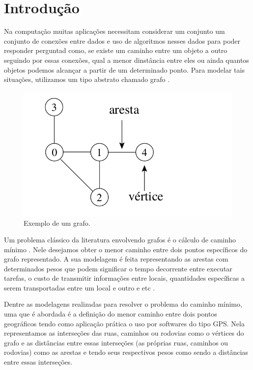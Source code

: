\chapter{Introdução}
\label{sec-intro}
Na computação muitas aplicações necessitam considerar um conjunto um conjunto de conexões entre dados e uso de algoritmos nesses dados para poder responder perguntad como, se existe um caminho entre um objeto a outro seguindo por essas conexões, qual a menor dinstância entre eles ou ainda quantos objetos podemos alcançar a partir de um determinado ponto. Para modelar tais situações, utilizamos um tipo abstrato chamado grafo \cite{ziviani2004projeto}.

\begin{figure}[H]
\centering
\includegraphics[width=.65\textwidth]{figuras/grafo-exemplo} 
\caption{Exemplo de um grafo.}
\label{fig-intro-exemplografo}
\end{figure}

Um problema clássico da literatura envolvendo grafos é o cálculo de caminho mínimo \cite{moura2010estudo}. Nele desejamos obter o menor caminho entre dois pontos específicos do grafo representado. A sua modelagem é feita representando as arestas com determinados pesos que podem significar o tempo decorrente entre executar tarefas, o custo de transmitir informações entre locais, quantidades específicas a serem transportadas entre um local e outro e etc \cite{drozdek2012data}. 

Dentre as modelagens realizadas para resolver o problema do caminho mínimo, uma que é abordada é a definição do menor caminho entre dois pontos geográficos tendo como aplicação prática o uso por softwares do tipo GPS. Nela representamos as interseções das ruas, caminhos ou rodovias como o vértices do grafo e as distâncias entre essas interseções (as próprias ruas, caminhos ou rodovias) como as arestas e tendo seus respectivos pesos como sendo a distâncias entre essas interseções.

